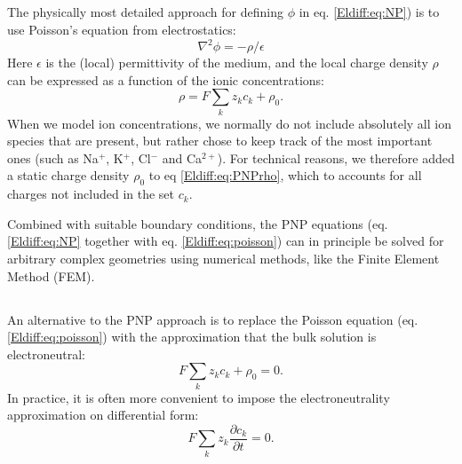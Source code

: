 \subsection{}
\label{sec:Eldiff:PNP}
The physically most detailed approach for defining $\phi$ in eq. \ref{Eldiff:eq:NP}) is to use Poisson's equation from electrostatics:
\begin{equation}
\nabla^2 \phi = -\rho/\epsilon
\label{Eldiff:eq:poisson}
\end{equation}
Here $\epsilon$ is the (local) permittivity of the medium, and the local charge density $\rho$ can be expressed as a function of the ionic concentrations:
\begin{equation}
\rho = F\sum_k z_k c_k + \rho_0.
\label{Eldiff:eq:PNPrho}
\end{equation}
When we model ion concentrations, we normally do not include absolutely all ion species that are present, but rather chose to keep track of the most important ones (such as Na$^+$, K$^+$, Cl$^-$ and Ca$^{2+}$). For technical reasons, we therefore added a static charge density $\rho_0$ to eq \ref{Eldiff:eq:PNPrho}, which to accounts for all charges not included in the set $c_k$. 

Combined with suitable boundary conditions, the PNP equations (eq. \ref{Eldiff:eq:NP} together with eq. \ref{Eldiff:eq:poisson}) can in principle be solved for arbitrary complex geometries using numerical methods, like the Finite Element Method (FEM). 


\subsection{}
\label{sec:Eldiff:electroneutral}
An alternative to the PNP approach is to replace the Poisson equation (eq. \ref{Eldiff:eq:poisson}) with the approximation that the bulk solution is electroneutral:
\begin{equation}
F \sum_k z_k c_k + \rho_0 = 0.
\label{Eldiff:eq:electroneutral}
\end{equation}
In practice, it is often more convenient to impose the electroneutrality approximation on differential form:
\begin{equation}
F \sum_k{z_k \frac{\partial c_k}{\partial t}} = 0.
\label{Eldiff:eq:electroneutral2}
\end{equation}

